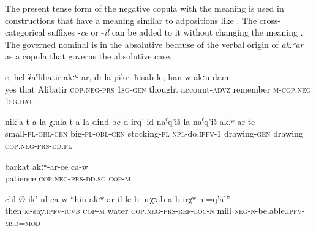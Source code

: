 The present tense form of the negative copula with the meaning  is used in constructions that have a meaning similar to adpositions like . The cross-categorical suffixes -\textit{ce} or -\textit{il} can be added to it without changing the meaning . The governed nominal is in the absolutive because of the verbal origin of \textit{akːʷar} as a copula that governs the absolutive case.
%
\begin{exe}
	\ex
	\begin{xlist}
		\ex	\label{Yes, except Alibatir, in my mind, I do not remember}
		\gll	e,	hel	ʡaˁlibatir	akːʷ-ar,	di-la	pikri	ħisab-le,	han	w-akːu	dam   \\
			yes	that	Alibatir	\textsc{cop.neg}-\textsc{prs}	1\textsc{sg}-\textsc{gen}	thought	account-\textsc{advz}	remember	\textsc{m}-\textsc{cop.neg}	1\textsc{sg.}\textsc{dat}\\
		\glt	{}

		\ex	\label{For children, for adults we make stockings, those with a drawing, those without a drawing}
		\gll	nik'a-t-a-la	χːula-t-a-la	dind-be	d-irq'-id	naˁq'iš-la	naˁq'iš	akːʷ-ar-te \\
			small-\textsc{pl}-\textsc{obl}-\textsc{gen}	big-\textsc{pl}-\textsc{obl}-\textsc{gen}	stocking-\textsc{pl}	\textsc{npl}-do.\textsc{ipfv}-1	drawing-\textsc{gen} drawing	\textsc{cop.neg}-\textsc{prs}-\textsc{dd.pl }\\
		\glt	{}

		\ex	\label{(He) lacks patience}
		\gll	barkat	akːʷ-ar-ce	ca-w  \\
			patience	\textsc{cop.neg}-\textsc{prs}-\textsc{dd}.\textsc{sg}	\textsc{cop-m}\\
		\glt	{}

		\ex	\label{‎‎He said, there where is no water a mill cannot be}
		\gll	c'il	Ø-ik'-ul ca-w		``hin	akːʷ-ar-il-le-b	urχːab	a-b-irχʷ-ni=q'al''  \\
			then	\textsc{m}-say.\textsc{ipfv}-\textsc{icvb} \textsc{cop-m} water \textsc{cop.neg}-\textsc{prs}-\textsc{ref}-\textsc{loc}-\textsc{n}	mill	\textsc{neg}-\textsc{n}-be.able.\textsc{ipfv}-\textsc{msd}=\textsc{mod}\\
		\glt	{}
	\end{xlist}
\end{exe}


